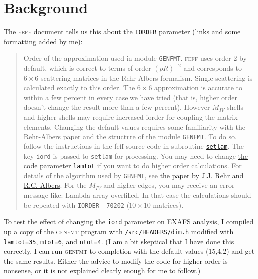 \documentclass{article}
\begin{document}
\appendix


\section{Background}


The
\href{http://leonardo.phys.washington.edu/feff/wiki/static/i/o/r/IORDER_326d.html}%
{\textsc{feff} document} tells us this about the \texttt{IORDER} parameter
(links and some formatting added by me):

\begin{quote}
  Order of the approximation used in module \texttt{GENFMT}.
  \textsc{feff} uses order 2 by default, which is correct to terms of
  order $(pR)^{-2}$ and corresponds to $6\times6$ scattering matrices
  in the Rehr-Albers formalism.  Single scattering is calculated
  exactly to this order.  The $6\times6$ approximation is accurate to
  within a few percent in every case we have tried (that is, higher
  order doesn’t change the result more than a few percent). However
  $M_{IV}$ shells and higher shells may require increased iorder for
  coupling the matrix elements.  Changing the default values requires
  some familiarity with the Rehr-Albers paper and the structure of the
  module \texttt{GENFMT}.  To do so, follow the instructions in the
  feff source code in subroutine
  \href{https://github.com/xraypy/feff85exafs/blob/master/src/GENFMT/setlam.f}%
  {\texttt{setlam}}.  The key \texttt{iord} is passed to
  \texttt{setlam} for processing.  You may need to change
  \href{https://github.com/xraypy/feff85exafs/blob/master/src/HEADERS/dim.h#L37}%
  {the code parameter \texttt{lamtot}} if you want to do higher order
  calculations.  For details of the algorithm used by \texttt{GENFMT},
  see \href{http://dx.doi.org/10.1103/PhysRevB.41.8139}%
  {the paper by J.J. Rehr and R.C. Albers}. For the $M_{IV}$ and
  higher edges, you may receive an error message like: Lambda array
  overfilled. In that case the calculations should be repeated with
  \texttt{IORDER -70202} ($10\times10$ matrices).
\end{quote}

To test the effect of changing the \texttt{iord} parameter on EXAFS
analysis, I compiled up a copy of the \textsc{genfmt} program with 
\href{https://github.com/xraypy/feff85exafs/blob/master/src/HEADERS/dim.h}%
{\texttt{/src/HEADERS/dim.h}} modified with \texttt{lamtot=35},
\texttt{mtot=6}, and \texttt{ntot=4}.  (I am a bit skeptical that I
have done this correctly.  I can run \textsc{genfmt} to completion
with the default values (15,4,2) and get the same results.  Either the
advice to modify the code for higher order is nonsense, or it is not
explained clearly enough for me to follow.)
\end{document}
